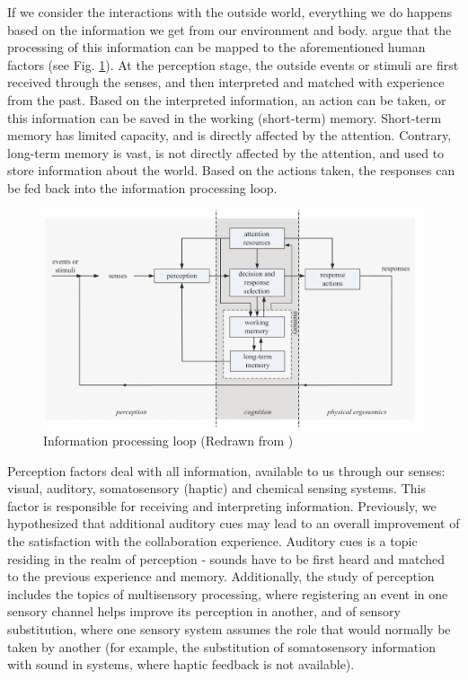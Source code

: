 
If we consider the interactions with the outside world, everything we do happens based on the information we get from our environment and body. \cite{jr_3d_2017} argue that the processing of this information can be mapped to the aforementioned human factors (see Fig. \ref{fig:informationprocessingloop}).
At the perception stage, the outside events or stimuli are first received through the senses, and then interpreted and matched with experience from the past. Based on the interpreted information, an action can be taken, or this information can be saved in the working (short-term) memory. Short-term memory has limited capacity, and is directly affected by the attention. Contrary, long-term memory is vast, is not directly affected by the attention, and used to store information about the world. Based on the actions taken, the responses can be fed back into the information processing loop.

\begin{figure}
	\centering
	\includegraphics[width=0.7\linewidth]{figures/placeholders/information_processing_loop}
	\caption{Information processing loop (Redrawn from \cite{jr_3d_2017})}
	\label{fig:informationprocessingloop}
\end{figure}

Perception factors deal with all information, available to us through our senses: visual, auditory, somatosensory (haptic) and chemical sensing systems. This factor is responsible for receiving and interpreting information.
Previously, we hypothesized that additional auditory cues may lead to an overall improvement of the satisfaction with the collaboration experience. Auditory cues is a topic residing in the realm of perception - sounds have to be first heard and matched to the previous experience and memory. 
Additionally, the study of perception includes the topics of multisensory processing, where registering an event in one sensory channel helps improve its perception in another, and of sensory substitution, where one sensory system assumes the role that would normally be taken by another (for example, the substitution of somatosensory information with sound in systems, where haptic feedback is not available).

